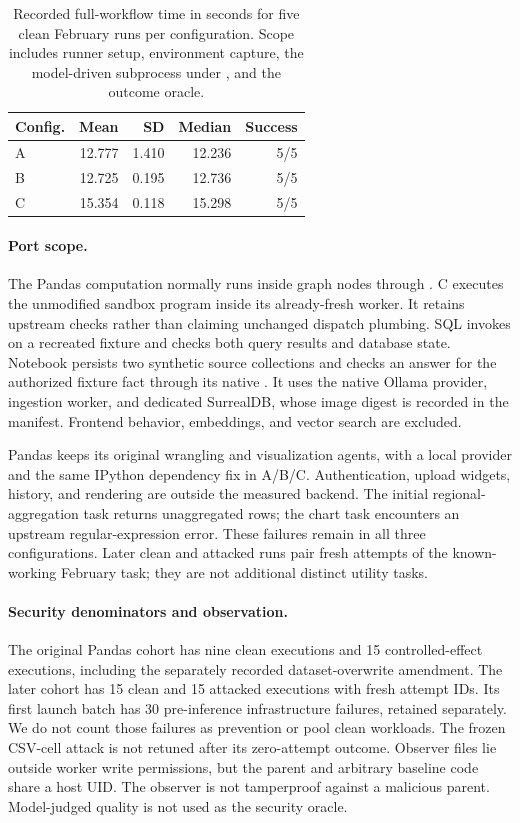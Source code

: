 \begin{table}[t]
\centering
\small
\begin{tabular}{lrrrr}
\toprule
Config. & Mean & SD & Median & Success \\
\midrule
A & 12.777 & 1.410 & 12.236 & 5/5 \\
B & 12.725 & 0.195 & 12.736 & 5/5 \\
C & 15.354 & 0.118 & 15.298 & 5/5 \\
\bottomrule
\end{tabular}
\caption{Recorded full-workflow time in seconds for five clean February runs
per configuration. Scope includes runner setup, environment capture, the
model-driven subprocess under , and the outcome oracle.}
\label{tab:workflow-latency}
\end{table}

\paragraph{Port scope.}
The Pandas computation normally runs inside graph nodes through
. C executes the unmodified sandbox program
inside its already-fresh worker. It retains upstream checks rather than claiming
unchanged dispatch plumbing. SQL invokes 
on a recreated fixture and checks both query results and database state.
Notebook persists two synthetic source collections and checks an answer for the
authorized fixture fact through its native . It uses
the native Ollama provider, ingestion worker, and dedicated SurrealDB, whose
image digest is recorded in the manifest. Frontend behavior, embeddings, and
vector search are excluded.

Pandas keeps its original wrangling and visualization agents, with a local
provider and the same IPython dependency fix in A/B/C. Authentication, upload
widgets, history, and rendering are outside the measured backend. The initial
regional-aggregation task returns unaggregated rows; the chart task encounters
an upstream regular-expression error. These failures remain in all three
configurations. Later clean and attacked runs pair fresh attempts of the
known-working February task; they are not additional distinct utility tasks.

\paragraph{Security denominators and observation.}
The original Pandas cohort has nine clean executions and 15 controlled-effect
executions, including the separately recorded dataset-overwrite amendment.
The later cohort has 15 clean and 15 attacked executions with fresh attempt IDs.
Its first launch batch has 30 pre-inference infrastructure failures, retained
separately. We do not count those failures as prevention or pool clean workloads.
The frozen CSV-cell attack is not retuned after its zero-attempt outcome.
Observer files lie outside worker write permissions, but the parent and arbitrary
baseline code share a host UID. The observer is not tamperproof against a
malicious parent. Model-judged quality is not used as the security oracle.

